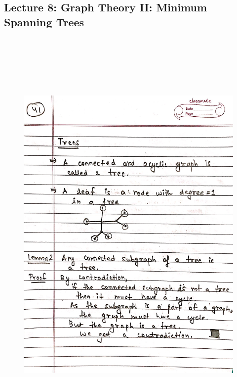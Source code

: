 \newpage
{\color{black} \subsection*{Lecture 8: Graph Theory II: Minimum Spanning Trees}}
\begin{figure}[H]
    \centering
    \includegraphics[width=16cm, height=21cm]{"./MIT-6.042J/MIT-6042J-041"}
\end{figure}

